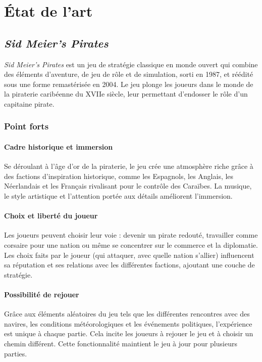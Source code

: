 \documentclass{article}
\begin{document}
\newpage
\section{État de l'art}
\subsection{\textit{Sid Meier’s Pirates}}\hfill

\textit{Sid Meier's Pirates} est un jeu de stratégie classique en monde ouvert qui combine des éléments d'aventure, de jeu de rôle et de simulation, sorti en 1987, et réédité sous une forme remastérisée en 2004. Le jeu plonge les joueurs dans le monde de la piraterie caribéenne du XVIIe siècle, leur permettant d'endosser le rôle d'un capitaine pirate.

\subsubsection{Point forts}
\paragraph{Cadre historique et immersion}\hfill

Se déroulant à l'âge d'or de la piraterie, le jeu crée une atmosphère riche grâce à des factions d'inspiration historique, comme les Espagnols, les Anglais, les Néerlandais et les Français rivalisant pour le contrôle des Caraïbes. La musique, le style artistique et l’attention portée aux détails améliorent l’immersion.

\paragraph{Choix et liberté du joueur}\hfill

Les joueurs peuvent choisir leur voie : devenir un pirate redouté, travailler comme corsaire pour une nation ou même se concentrer sur le commerce et la diplomatie. Les choix faits par le joueur (qui attaquer, avec quelle nation s'allier) influencent sa réputation et ses relations avec les différentes factions, ajoutant une couche de stratégie.

\paragraph{Possibilité de rejouer}\hfill

Grâce aux éléments aléatoires du jeu tels que les différentes rencontres avec des navires, les conditions météorologiques et les événements politiques, l'expérience est unique à chaque partie. Cela incite les joueurs à rejouer le jeu et à choisir un chemin différent. Cette fonctionnalité maintient le jeu à jour pour plusieurs parties.
\end{document}
